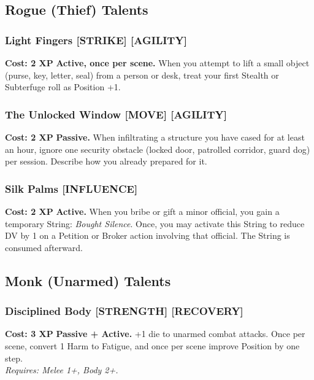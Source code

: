 \subsection*{Rogue (Thief) Talents}
\label{sec:minor-rogue}

\subsubsection*{Light Fingers \textnormal{[STRIKE] [AGILITY]}}
\label{talent:light-fingers}
\textbf{Cost: 2 XP} \textbf{Active, once per scene.} When you attempt to lift a small object (purse, key, letter, seal) from a person or desk, treat your first Stealth or Subterfuge roll as Position +1.

\subsubsection*{The Unlocked Window \textnormal{[MOVE] [AGILITY]}}
\label{talent:unlocked-window}
\textbf{Cost: 2 XP} \textbf{Passive.} When infiltrating a structure you have cased for at least an hour, ignore one security obstacle (locked door, patrolled corridor, guard dog) per session. Describe how you already prepared for it.

\subsubsection*{Silk Palms \textnormal{[INFLUENCE]}}
\label{talent:silk-palms}
\textbf{Cost: 2 XP} \textbf{Active.} When you bribe or gift a minor official, you gain a temporary String: \textit{Bought Silence}. Once, you may activate this String to reduce DV by 1 on a Petition or Broker action involving that official. The String is consumed afterward.

\subsection*{Monk (Unarmed) Talents}
\label{sec:minor-monk}

\subsubsection*{Disciplined Body \textnormal{[STRENGTH] [RECOVERY]}}
\label{talent:disciplined-body}
\textbf{Cost: 3 XP} \textbf{Passive + Active.} +1 die to unarmed combat attacks. Once per scene, convert 1 Harm to Fatigue, and once per scene improve Position by one step. \\
\textit{Requires: Melee 1+, Body 2+.}

